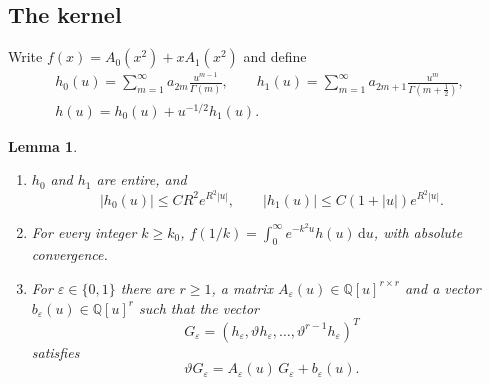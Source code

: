 \documentclass[11pt,reqno]{amsart}
\newtheorem{lemma}[theorem]{Lemma}
\theoremstyle{definition}
\theoremstyle{remark}
\newcommand{\dd}{\,\mathrm{d}}
\newcommand{\QQ}{\mathbb{Q}}
\begin{document}
\subsection{The kernel}
Write $f(x) = A_0(x^2) + x A_1(x^2)$ and define
\begin{equation}\label{eq:kernels}
\begin{gathered}
  h_0(u) = \sum_{m=1}^{\infty} a_{2m}\frac{u^{m-1}}{\Gamma(m)}, \qquad
  h_1(u) = \sum_{m=1}^{\infty} a_{2m+1} \frac{u^{m}}{\Gamma(m+\frac12)}, \\
  h(u) = h_0(u) + u^{-1/2} h_1(u).
\end{gathered}
\end{equation}

\begin{lemma}\label{lem:kernel}
\begin{enumerate}
\item $h_0$ and $h_1$ are entire, and
\[
  |h_0(u)| \le C R^2 e^{R^2|u|}, \qquad |h_1(u)| \le C (1 + |u|)e^{R^2|u|}.
\]
\item For every integer $k \ge k_0$, $f(1/k) = \int_0^\infty e^{-k^2 u} h(u)\dd u$, with absolute convergence.
\item For $\varepsilon \in \{0,1\}$ there are $r \ge 1$, a matrix $A_\varepsilon(u) \in \QQ[u]^{r\times r}$ and a vector
$b_\varepsilon(u) \in \QQ[u]^r$ such that the vector
\[
  G_\varepsilon = (h_\varepsilon, \vartheta h_\varepsilon, \dots, \vartheta^{r-1}h_\varepsilon)^T
\]
satisfies
\begin{equation}\label{eq:Gsys}
  \vartheta G_\varepsilon = A_\varepsilon(u)\, G_\varepsilon + b_\varepsilon(u).
\end{equation}
\end{enumerate}
\end{lemma}
\end{document}
